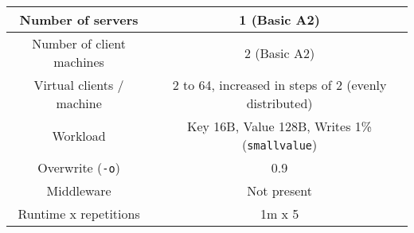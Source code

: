 \documentclass[11pt]{article}
\begin{document}
\small{
\smallskip
\begin{tabular}{|c|c|}
\hline Number of servers & 1 (Basic A2) \\ 
\hline Number of client machines & 2 (Basic A2) \\ 
\hline Virtual clients / machine & 2 to 64, increased in steps of 2 (evenly distributed) \\ 
\hline Workload & Key 16B, Value 128B, Writes 1\% (\texttt{smallvalue}) \\
\hline Overwrite (\texttt{-o}) & 0.9\\
\hline Middleware & Not present \\ 
\hline Runtime x repetitions & 1m x 5 \\ 
\hline 
\end{tabular} }\\

%
%
\end{document}

